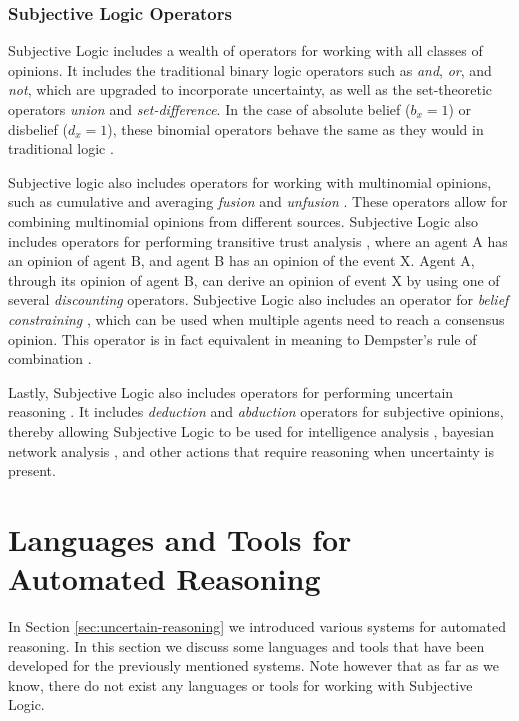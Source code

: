 \documentclass[thesis.tex]{subfiles}
\begin{document}
\subsubsection{Subjective Logic Operators}

Subjective Logic includes a wealth of operators for working with all classes of opinions. It includes
the traditional binary logic operators such as \emph{and}, \emph{or}, and \emph{not}, which are
upgraded to incorporate uncertainty, as well as the set-theoretic operators \emph{union} and
\emph{set-difference}. In the case of absolute belief ($b_x = 1$) or disbelief ($d_x =1$), these
binomial operators behave the same as they would in traditional logic \cite{mcanally2004addition, josang2005multiplication}.

Subjective logic also includes operators for working with multinomial opinions, such as
cumulative and averaging \emph{fusion} and \emph{unfusion} \cite{josang2010cumulative, josang2009cumulative, josang2009fission, josang2012interpretation}.
These operators allow for combining
multinomial opinions from different sources. Subjective Logic also includes operators for performing
transitive trust analysis \cite{josang2001logic, josang2006trust}, where an agent A has an opinion of agent B, and agent B has an opinion of
the event X. Agent A, through its opinion of agent B, can derive an opinion of event X by using one
of several \emph{discounting} operators. Subjective Logic also includes an operator for
\emph{belief constraining} \cite{josang2012dempster}, which can be used when multiple agents need to reach a consensus opinion.
This operator is in fact equivalent in meaning to Dempster's rule of combination \cite{josang2012dempster}.

Lastly, Subjective Logic also includes operators for performing uncertain reasoning \cite{josanginverting, josang2008conditional, josang2008abductive}.
It includes \emph{deduction} and \emph{abduction} operators for subjective opinions, thereby allowing Subjective
Logic to be used for intelligence analysis \cite{pope2005analysis},
bayesian network analysis \cite{josang2008conditional}, and other actions that
require reasoning when uncertainty is present.




\section{Languages and Tools for Automated Reasoning}

In Section \ref{sec:uncertain-reasoning} we introduced various systems for automated reasoning. In this
section we discuss some languages and tools that have been developed for the previously mentioned
systems. Note however that as far as we know, there do not exist any languages or tools for working
with Subjective Logic.
\end{document}

